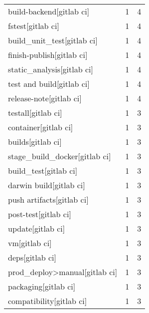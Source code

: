 \begin{tabular}{lrr}
build-backend[gitlab ci]                   &                   1 &             4 \\
fstest[gitlab ci]                          &                   1 &             4 \\
build\_unit\_test[gitlab ci]                 &                   1 &             4 \\
finish-publish[gitlab ci]                  &                   1 &             4 \\
static\_analysis[gitlab ci]                 &                   1 &             4 \\
test and build[gitlab ci]                  &                   1 &             4 \\
release-note[gitlab ci]                    &                   1 &             4 \\
testall[gitlab ci]                         &                   1 &             3 \\
container[gitlab ci]                       &                   1 &             3 \\
builds[gitlab ci]                          &                   1 &             3 \\
stage\_build\_docker[gitlab ci]              &                   1 &             3 \\
build\_test[gitlab ci]                      &                   1 &             3 \\
darwin build[gitlab ci]                    &                   1 &             3 \\
push artifacts[gitlab ci]                  &                   1 &             3 \\
post-test[gitlab ci]                       &                   1 &             3 \\
update[gitlab ci]                          &                   1 &             3 \\
vm[gitlab ci]                              &                   1 &             3 \\
deps[gitlab ci]                            &                   1 &             3 \\
prod\_deploy>manual[gitlab ci]              &                   1 &             3 \\
packaging[gitlab ci]                       &                   1 &             3 \\
compatibility[gitlab ci]                   &                   1 &             3 \\

\end{tabular}
